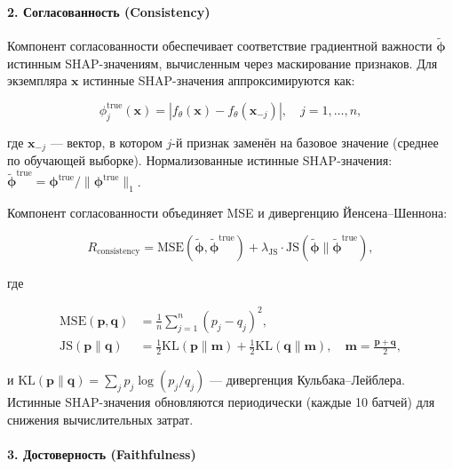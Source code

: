 \paragraph{2. Согласованность (Consistency)}

Компонент согласованности обеспечивает соответствие градиентной важности $\tilde{\boldsymbol{\phi}}$ истинным SHAP-значениям, вычисленным через маскирование признаков. Для экземпляра $\mathbf{x}$ истинные SHAP-значения аппроксимируются как:

\begin{equation}
\phi_j^{\text{true}}(\mathbf{x}) = \left| f_{\theta}(\mathbf{x}) - f_{\theta}(\mathbf{x}_{-j}) \right|, \quad j = 1, \ldots, n,
\end{equation}

где $\mathbf{x}_{-j}$ --- вектор, в котором $j$-й признак заменён на базовое значение (среднее по обучающей выборке). Нормализованные истинные SHAP-значения: $\tilde{\boldsymbol{\phi}}^{\text{true}} = \boldsymbol{\phi}^{\text{true}} / \|\boldsymbol{\phi}^{\text{true}}\|_1$.

Компонент согласованности объединяет MSE и дивергенцию Йенсена--Шеннона:

\begin{equation}
R_{\text{consistency}} = \text{MSE}(\tilde{\boldsymbol{\phi}}, \tilde{\boldsymbol{\phi}}^{\text{true}}) + \lambda_{\text{JS}} \cdot \text{JS}(\tilde{\boldsymbol{\phi}} \| \tilde{\boldsymbol{\phi}}^{\text{true}}),
\end{equation}

где

\begin{align}
\text{MSE}(\mathbf{p}, \mathbf{q}) &= \frac{1}{n} \sum_{j=1}^{n} (p_j - q_j)^2, \\
\text{JS}(\mathbf{p} \| \mathbf{q}) &= \frac{1}{2} \text{KL}(\mathbf{p} \| \mathbf{m}) + \frac{1}{2} \text{KL}(\mathbf{q} \| \mathbf{m}), \quad \mathbf{m} = \frac{\mathbf{p} + \mathbf{q}}{2},
\end{align}

и $\text{KL}(\mathbf{p} \| \mathbf{q}) = \sum_j p_j \log(p_j / q_j)$ --- дивергенция Кульбака--Лейблера. Истинные SHAP-значения обновляются периодически (каждые 10 батчей) для снижения вычислительных затрат.

\paragraph{3. Достоверность (Faithfulness)}

